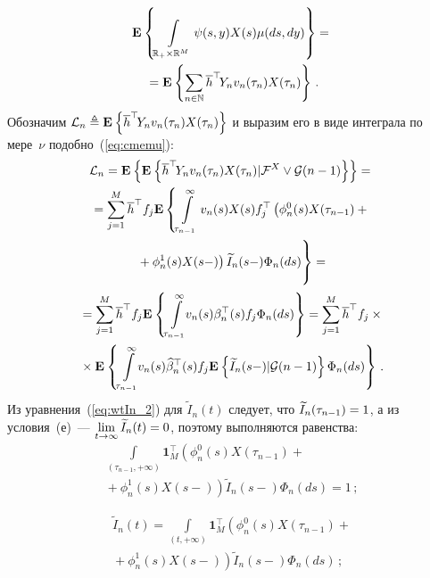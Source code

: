 \begin{multicols}{2}
{\noindent
\begin{multline*}
 \mathbf{E}_{  }\left\{ \mathop{\int\limits_{\mathbb{R}_{+}\times \mathbb{R}^M} \psi(s,y)X(s)\mu(ds,dy)} \right\} ={}\\
 {}=
 \mathbf{E}_{  }\left\{ \mathop{\sum\limits_{n \in \mathbb{N}} \overline{h}^{\top}\!Y_n v_n(\tau_n)X(\tau_n)} \right\}\,.
\end{multline*}
Обозначим $\mathcal{L}_n \triangleq \mathbf{E}_{  }\left\{ \mathop{\overline{h}^{\top}\!Y_n v_n(\tau_n)X(\tau_n)} \right\}$
и выразим его в виде интеграла по мере~$\nu$ подобно~(\ref{eq:cmemu}):
\begin{multline*}
\mathcal{L}_n = \me{}{\me{}{\overline{h}^{\top}\!Y_n v_n(\tau_n)X(\tau_n)|
\ff^X\vee \G(n-1)}}={}\\
{}=
\sum\limits_{j=1}^M \overline{h}^{\top}f_j
\mathbf{E}\left\{\int\limits_{\tau_{n-1}}^{\infty}v_n(s)X(s)f^{\top}_j\left(
\phi^0_n(s)X(\tau_{n-1})+{}\right.\right.\\
\left.\left.{}+\phi^1_n(s)X(s-)\right)
\widetilde{I}_{n}(s-)\Phi_n(ds)
\vphantom{\int\limits_{\tau_{n-1}}^{\infty}}
\right\}={}\\
{}= \sum\limits_{j=1}^M \overline{h}^{\top}f_j
\me{}{\int\limits_{\tau_{n-1}}^{\infty}\!\!v_n(s)
\beta_n^{\top}(s)f_j\Phi_n(ds)}=
\sum\limits_{j=1}^M \overline{h}^{\top}f_j\times{}\\
{}\times
\me{}{\int\limits_{\tau_{n-1}}^{\infty}\!\!v_n(s)\widehat{\beta}^{\top}_n(s)
f_j\me{}{\widetilde{I}_{n}(s-)|\G(n-1)}
\Phi_n(ds)}\,.
\end{multline*}
 Из уравнения~(\ref{eq:wtIn_2}) для $\widetilde{I}_{n}(t)$ следует,
 что $\widetilde{I}_{n}(\tau_{n-1})\hm=1$, а из условия~({е})~---
$\lim\limits_{t \to \infty}\widetilde{I}_{n}(t)\hm = 0$,
 поэтому выполняются равенства:
\begin{multline*}
  \int\limits_{(\tau_{n-1},+\infty)}\mathbf{1}_M^{\top}\left(
  \phi^0_n(s)X(\tau_{n-1})+{}\right.\\
\left.  {}+\phi^1_n(s)X(s-)\right)\widetilde{I}_{n}(s-)\Phi_n(ds) =1\,;
\end{multline*}

\vspace*{-8pt}

\noindent
\begin{multline*}
 \widetilde{I}_{n}(t)=\int\limits_{(t,+\infty)}\mathbf{1}_M^{\top}\left(
 \phi^0_n(s)X(\tau_{n-1})+{}\right.\\
\left. {}+\phi^1_n(s)X(s-)\right)\widetilde{I}_{n}(s-)\Phi_n(ds)\,;
\end{multline*}

\vspace*{-8pt}

}
\end{multicols}
